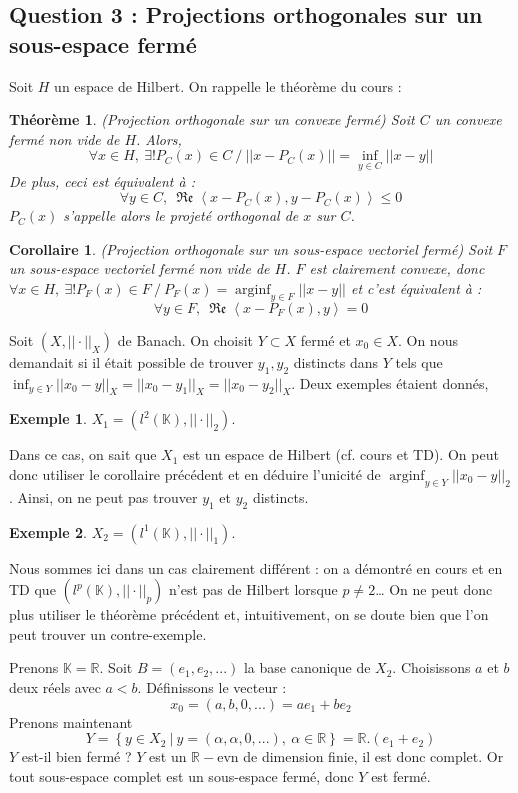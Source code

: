 \documentclass[a4paper,11pt]{article}
\theoremstyle{plain}
\newtheorem*{theo}{Théorème}
\newtheorem*{coro}{Corollaire}
\theoremstyle{definition}
\newtheorem*{expl}{Exemple}
\DeclareMathOperator{\arginf}{arginf}
\renewcommand{\Re}{\operatorname{\mathfrak{Re}}}
\begin{document}
\subsection*{Question 3 : Projections orthogonales sur un sous-espace fermé}
Soit $H$ un espace de Hilbert. On rappelle le théorème du cours :
\begin{theo} (Projection orthogonale sur un convexe fermé)
Soit $C$ un convexe fermé non vide de $H$.
Alors,
\[
	\forall x \in H, \ \exists ! P_C(x) \in C \ / \ ||x - P_C(x)|| = \inf_{y \in C} ||x - y|| 
\]
De plus, ceci est équivalent à :
\[
	\forall y \in C, \ \Re\left<x - P_C(x), y - P_C(x)\right> \leq 0 
\]
$P_C(x)$ s'appelle alors le projeté orthogonal de $x$ sur $C$.
\end{theo}
\begin{coro} (Projection orthogonale sur un sous-espace vectoriel fermé)
Soit $F$ un sous-espace vectoriel fermé non vide de $H$.
$F$ est clairement convexe, donc $\forall x \in H, \ \exists ! P_F(x) \in F \ / \ P_F(x) = \arginf_{y \in F} ||x - y||$ et c'est équivalent à :
\[
	\forall y \in F, \ \Re\left<x - P_F(x), y\right> = 0 
\]
\end{coro}

Soit $(X, ||\cdot||_X)$ de Banach. On choisit $Y \subset X$ fermé et $x_0 \in X$.
On nous demandait si il était possible de trouver $y_1, y_2$ distincts dans $Y$ tels que $\inf_{y \in Y} ||x_0 - y||_X  = ||x_0 - y_1||_X = ||x_0 - y_2 ||_X$.
Deux exemples étaient donnés,
\begin{expl}
$X_1 = (l^2\left(\mathbb{K}\right), ||\cdot||_2)$.
\end{expl}
Dans ce cas, on sait que $X_1$ est un espace de Hilbert (cf. cours et TD).
On peut donc utiliser le corollaire précédent et en déduire l'unicité de $\arginf_{y \in Y} ||x_0 - y||_2$.
Ainsi, on ne peut pas trouver $y_1$ et $y_2$ distincts.

\begin{expl}
$X_2 = (l^1\left(\mathbb{K}\right), ||\cdot||_1)$.
\end{expl}
Nous sommes ici dans un cas clairement différent : on a démontré en cours et en TD que $(l^p\left(\mathbb{K}\right), ||\cdot||_p)$ n'est pas de Hilbert lorsque $p \neq 2$…
On ne peut donc plus utiliser le théorème précédent et, intuitivement, on se doute bien que l'on peut trouver un contre-exemple.

Prenons $\mathbb{K} = \mathbb{R}$.
Soit $B = (e_1, e_2, ...)$ la base canonique de $X_2$.
Choisissons $a$ et $b$ deux réels avec $a < b$.
Définissons le vecteur :
\[
x_0 = (a, b, 0, ...) = ae_1 + be_2
\]
Prenons maintenant 
\[
Y = \left\{y \in X_2 \ | \ y = (\alpha, \alpha, 0, ...), \ \alpha \in \mathbb{R}\right\} = \mathbb{R}.(e_1+e_2)
\]
$Y$ est-il bien fermé ?
$Y$ est un $\mathbb{R}-$evn de dimension finie, il est donc complet.
Or tout sous-espace complet est un sous-espace fermé, donc $Y$ est fermé.
\end{document}
